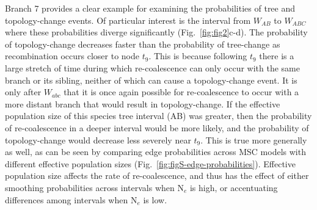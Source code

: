 \documentclass[11pt]{article}
\begin{document}
Branch 7 provides a clear example for examining the probabilities of 
tree and topology-change events. Of particular interest is the 
interval from $W_{AB}$ to $W_{ABC}$ where these probabilities diverge 
significantly (Fig.~\ref{fig:fig2}c-d). 
The probability of topology-change decreases faster than the probability of 
tree-change as recombination occurs closer to node $t_9$. This is because 
following $t_9$ there is a large stretch of time during which re-coalescence can
only occur with the same branch or its sibling, neither of which can cause a topology-change
event. It is only after $W_{abc}$ that it is once again possible for re-coalescence
to occur with a more distant branch that would result in topology-change. 
If the effective population size of this species tree interval (AB) was greater,
then the probability of re-coalescence in a deeper interval would be more likely, 
and the probability of topology-change would decrease less severely near $t_9$. 
This is true more generally as well, as can be seen by comparing edge probabilities
across MSC models with different effective population sizes (Fig.~\ref{fig:figS-edge-probabilities}).
Effective population size affects the rate of re-coalescence, and thus 
has the effect of either smoothing probabilities across intervals when 
N$_e$ is high, or accentuating differences among intervals when N$_e$ is low.

\end{document}
